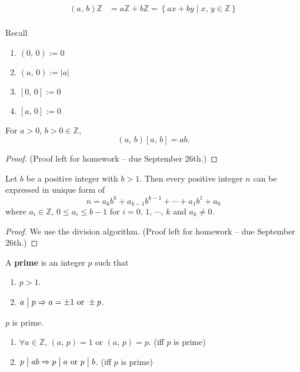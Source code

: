 \begin{remark}
    \begin{align*}
        \left(a,\,b\right)\mathbb{Z} &= a\mathbb{Z} + b\mathbb{Z} = \left\{ax+by \mid x,\,y\in\mathbb{Z}\right\} \\
    \end{align*}
\end{remark}

Recall
\begin{enumerate}
    \item $\left(0,\,0\right) := 0$
    \item $\left(a,\,0\right) := \left|a\right|$
    \item $\left[0,\,0\right] := 0$
    \item $\left[a,\,0\right] := 0$
\end{enumerate}

\begin{theorem}
    For $a>0,\,b>0\in\mathbb{Z}$, \[\left(a,\,b\right)\left[a,\,b\right] = ab.\]
\end{theorem}

\begin{proof}
    (Proof left for homework -- due September 26th.)
\end{proof}

\begin{theorem}
    Let $b$ be a positive integer with $b>1$. Then every positive integer
    $n$ can be expressed in unique form of
    \[
        n=a_kb^k + a_{k-1}b^{k-1} + \cdots + a_1b^1 + a_0
    \]  
    where $a_i \in \mathbb{Z}$, $0 \leq a_i \leq b-1$ for $i=0,\,1,\,\cdots,\,k$
    and $a_k \neq 0$.
\end{theorem}

\begin{proof}
    We use the division algorithm. (Proof left for homework -- due September 26th.)
\end{proof}

\begin{definition}
    A \textbf{prime} is an integer $p$ such that
    \begin{enumerate}
        \item $p>1$.
        \item $a\bigm| p \Rightarrow a = \pm 1 \mbox{ or } \pm p$.
    \end{enumerate}
\end{definition}

\begin{remark}
    $p$ is prime.

    \begin{enumerate}
        \item $\forall a \in \mathbb{Z},\, \left(a,\,p\right) = 1 \mbox{ or } \left(a,\,p\right) = p$. (iff $p$ is prime)
        \item $p \bigm| ab \Rightarrow p \bigm| a \mbox{ or } p \bigm| b$. (iff $p$ is prime)
    \end{enumerate}
\end{remark}

